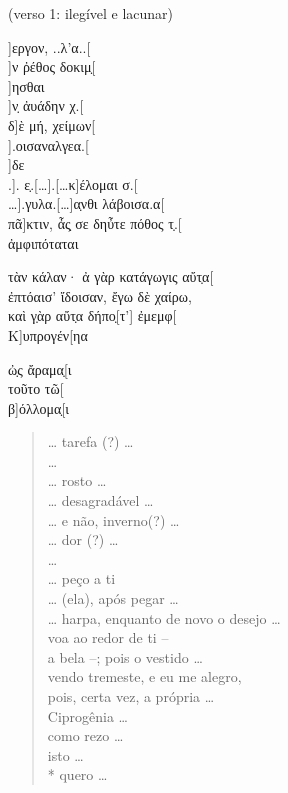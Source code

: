 \begin{gkverse}
\textnormal{(verso 1: ilegível e lacunar)}

]εργον, ..λ’α..[\\
  ]ν ῤέθος δοκιμ̣[\\
    ]ησθαι\\
]ν̣ ἀυάδην χ.[\\
δ]ὲ μή, χείμων[\\
  ].οισαναλγεα.[\\
  ]δε\\
.]. ε̣.[\ldots{}].[\ldots{}κ]έλομαι σ.[\\
\ldots{}].γυλα.[\ldots{}]α̣νθι λάβοισα.α[\\
πᾶ]κτιν, ἆς̣ σε δηὖτε πόθος τ̣.[\\
ἀμφιπόταται

τὰν κάλαν· ἀ γὰρ κατάγωγις αὔτ̣α[\\
ἐπτόαισ’ ἴδοισαν, ἔγω δὲ χαίρω,\\
καὶ γ̣ὰρ αὔτ̣α δήπο̣[τ’] ἐμεμφ[\\
Κ]υπρογέν[ηα

ὠ̣ς ἄραμα̣[ι\\
τοῦτο τῶ[\\
β]όλλομα̣[ι

\end{gkverse}


\begin{verse}
\ldots{} tarefa (?) \ldots{}\\
\ldots{}\\ 
\ldots{}  rosto \ldots{}\\  
\ldots{}  desagradável \ldots{}\\
\ldots{}  e não, inverno(?) \ldots{}\\
\ldots{}  dor (?) \ldots{}\\
\ldots{}\\ 
\ldots{}  peço a ti\\
\ldots{}  (ela), após pegar \ldots{}\\
\ldots{} harpa, enquanto de novo o desejo \ldots{}\\
voa ao redor de ti --\\
a bela --; pois o vestido \ldots{}\\
vendo tremeste, e eu me alegro,\\
pois, certa vez, a própria \ldots{} \\
Ciprogênia \ldots{}\\
como rezo \ldots{}\\
isto \ldots{}\\*
quero \ldots{}\\
\end{verse}

